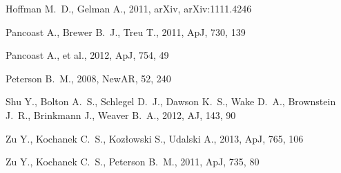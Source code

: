 \documentclass[useAMS,usenatbib]{mn2e}
\begin{document}
\begin{thebibliography}{99}
 Hoffman M.~D., Gelman A., 2011, arXiv, arXiv:1111.4246 

 Pancoast A., Brewer B.~J., Treu T., 2011, ApJ, 730, 139 

 Pancoast A., et al., 2012, ApJ, 754, 49 

Peterson B.~M., 2008, NewAR, 52, 240 

Shu Y., Bolton A.~S., Schlegel D.~J., Dawson K.~S., Wake D.~A., Brownstein 
J.~R., Brinkmann J., Weaver B.~A., 2012, AJ, 143, 90 

 Zu 
Y., Kochanek C.~S., Koz{\l}owski S., Udalski A., 2013, ApJ, 765, 106 

 Zu Y., Kochanek C.~S., Peterson B.~M., 2011, ApJ, 735, 80 



\end{thebibliography}
\end{document}
